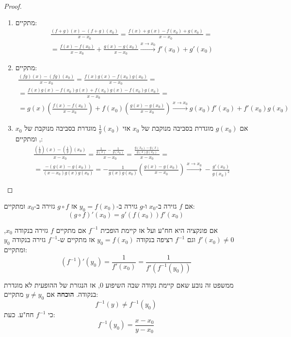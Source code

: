 \documentclass{tstextbook}
\begin{document}
\begin{proof}
  \begin{enumerate}
    \item מתקיים: 
\begin{gather*}\frac{(f+g)(x)-(f+g)(x_{0})}{x-x_{0}}= \frac{f(x)+g(x)-f(x_{0})+g(x_{0})}{x-x_{0}}=  \\=\frac{f(x)-f(x_{0})}{x-x_{0}}+ \frac{g(x)-g(x_{0})}{x-x_{0}}\xrightarrow{x\to x_{0}}f'(x_{0})+g'(x_{0})
\end{gather*}


    \item מתקיים: 
\begin{gather*}\frac{(fg)(x)-(fg)(x_{0})}{x-x_{0}}=\frac{f(x)g(x)-f(x_{0})g(x_{0})}{x-x_{0}}=  \\=\frac{f(x)g(x)-f(x_{0})g(x)+f(x_{0})g(x)-f(x_{0})g(x_{0})}{x-x_{0}}= \\=g(x)\left( \frac{f(x)-f(x_{0})}{x-x_{0}} \right)+f(x_{0})\left( \frac{g(x)-g(x_{0})}{x-x_{0}} \right)\xrightarrow{x\to x_{0}} g(x_{0})f'(x_{0})+ f'(x_{0})g(x_{0})
\end{gather*}


    \item אם \(g(x_{0})\) מוגדרת בסביבה מנוקבת של \(x_{0}\) אזי \(\frac{1}{g}(x_{0})\) מוגדרת בסביבה מנוקבת של \(x_{0}\), ומתקיים: 
\begin{gather*}\frac{\left( \frac{1}{g} \right)(x)-\left( \frac{1}{g} \right)(x_{0})}{x-x_{0}}= \frac{\frac{1}{g(x)}-\frac{1}{g(x_{0})}}{x-x_{0}}=\frac{\frac{g(x_{0})-g(x)}{g(x)g(x_{0})}}{x-x_{0}}=  \\=\frac{-(g(x)-g(x_{0}))}{(x-x_{0})g(x)g(x_{0})}=-\frac{1}{g(x)g(x_{0})}\left( \frac{g(x)-g(x_{0})}{x-x_{0}} \right)\xrightarrow{x\to x_{0}} -\frac{g'(x_{0})}{g(x_{0})^{2}}
\end{gather*}


  \end{enumerate}
\end{proof}
\begin{theorem}
אם \(f\) גזירה ב-\(x_{0}\) ו-\(g\) גזירה ב-\(y_{0}=f(x_{0})\) אז \(g\circ f\) גזירה ב-\(x_{0}\) ומתקיים:
$$\left( g\circ f \right)'(x_{0})=g'(f(x_{0}))f'(x_{0})$$

\end{theorem}
\begin{theorem}
אם פונקציה היא חח"ע ועל אז קיימת הופכית \(f^{-1}\)
אם מתקיים \(f\) גזירה בנקודה \(x_0\), \(f'(x_0) \neq 0\) וגם \(f^{-1}\) רציפה בנקודה \(y_0=f(x_0)\) אז מתקיים ש-\(f^{-1}\) גזירה בנקודה \(y_0\) ומתקיים:
$$(f^{-1})'(y_0) = \frac{1}{f'(x_0)}=\frac{1}{f'(f^{-1} (y_0))}$$

\end{theorem}
ממשפט זה נובע שאם קיימת נקודה שבה השיפוע 0, אז הנגזרת של ההופעית לא מוגדרת בנקודה.
\textbf{הוכחה}
אם \(y\neq y_{0}\) מתקיים:
$$f^{-1}(y)\neq f^{-1}(y_{0})$$
כי \(f^{-1}\) חח"ע. כעת:
$$f^{-1}(y_{0})=\frac{x-x_{0}}{y-x_{0}}$$
\end{document}
